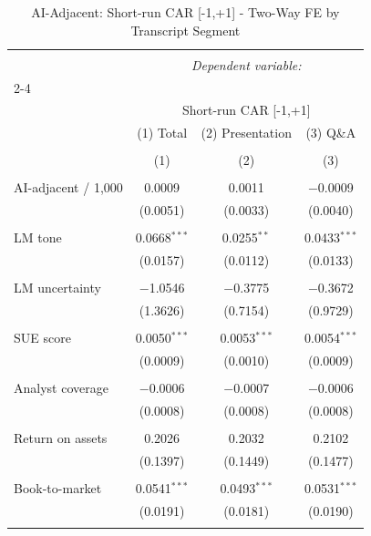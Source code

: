 
\begin{table}[!htbp] \centering 
  \caption{AI-Adjacent: Short-run CAR [-1,+1] - Two-Way FE by Transcript Segment} 
  \label{} 
\begin{tabular}{@{\extracolsep{5pt}}lccc} 
\\[-1.8ex]\hline 
\hline \\[-1.8ex] 
 & \multicolumn{3}{c}{\textit{Dependent variable:}} \\ 
\cline{2-4} 
\\[-1.8ex] & \multicolumn{3}{c}{Short-run CAR [-1,+1]} \\ 
 & (1) Total & (2) Presentation & (3) Q\&A \\ 
\\[-1.8ex] & (1) & (2) & (3)\\ 
\hline \\[-1.8ex] 
 AI-adjacent / 1,000 & 0.0009 & 0.0011 & $-$0.0009 \\ 
  & (0.0051) & (0.0033) & (0.0040) \\ 
  & & & \\ 
 LM tone & 0.0668$^{***}$ & 0.0255$^{**}$ & 0.0433$^{***}$ \\ 
  & (0.0157) & (0.0112) & (0.0133) \\ 
  & & & \\ 
 LM uncertainty & $-$1.0546 & $-$0.3775 & $-$0.3672 \\ 
  & (1.3626) & (0.7154) & (0.9729) \\ 
  & & & \\ 
 SUE score & 0.0050$^{***}$ & 0.0053$^{***}$ & 0.0054$^{***}$ \\ 
  & (0.0009) & (0.0010) & (0.0009) \\ 
  & & & \\ 
 Analyst coverage & $-$0.0006 & $-$0.0007 & $-$0.0006 \\ 
  & (0.0008) & (0.0008) & (0.0008) \\ 
  & & & \\ 
 Return on assets & 0.2026 & 0.2032 & 0.2102 \\ 
  & (0.1397) & (0.1449) & (0.1477) \\ 
  & & & \\ 
 Book-to-market & 0.0541$^{***}$ & 0.0493$^{***}$ & 0.0531$^{***}$ \\ 
  & (0.0191) & (0.0181) & (0.0190) \\ 
  & & & \\ 

\end{tabular}
\end{table}
